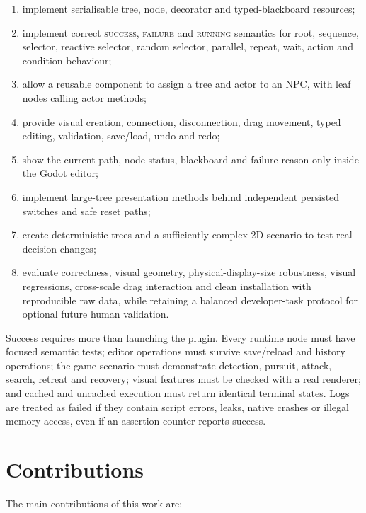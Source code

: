 \begin{enumerate}
    \item implement serialisable tree, node, decorator and typed-blackboard resources;
    \item implement correct \textsc{success}, \textsc{failure} and \textsc{running} semantics for root, sequence, selector, reactive selector, random selector, parallel, repeat, wait, action and condition behaviour;
    \item allow a reusable component to assign a tree and actor to an NPC, with leaf nodes calling actor methods;
    \item provide visual creation, connection, disconnection, drag movement, typed editing, validation, save/load, undo and redo;
    \item show the current path, node status, blackboard and failure reason only inside the Godot editor;
    \item implement large-tree presentation methods behind independent persisted switches and safe reset paths;
    \item create deterministic trees and a sufficiently complex 2D scenario to test real decision changes;
    \item evaluate correctness, visual geometry, physical-display-size robustness, visual regressions, cross-scale drag interaction and clean installation with reproducible raw data, while retaining a balanced developer-task protocol for optional future human validation.
\end{enumerate}

Success requires more than launching the plugin. Every runtime node must have focused semantic tests; editor operations must survive save/reload and history operations; the game scenario must demonstrate detection, pursuit, attack, search, retreat and recovery; visual features must be checked with a real renderer; and cached and uncached execution must return identical terminal states. Logs are treated as failed if they contain script errors, leaks, native crashes or illegal memory access, even if an assertion counter reports success.

\section{Contributions}

The main contributions of this work are:

